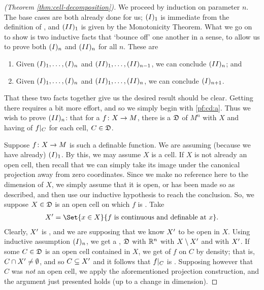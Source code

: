 \begin{proof}[\CD (Theorem \ref{thm:cell-decomposition})]
  We proceed by induction on parameter $n$. The base cases are both already done for us; $\In[1]$ is immediate from the definition of \omy, and $\IIn[1]$ is given by the Monotonicity Theorem. What we go on to show is two inductive facts that `bounce off' one another in a sense, to allow us to prove both $\In$ and $\IIn$ for all $n$. These are
  \begin{enumerate}[label=(\alph*)]
    \item \label{pf:cd:a} Given $\In[1], \hdots, \In$ and $\IIn[1], \hdots, \IIn[n-1]$, we can conclude $\IIn$; and
    \item \label{pf:cd:b} Given $\In[1], \hdots, \In$ and $\IIn[1], \hdots, \IIn[n]$, we can conclude $\In[n+1]$.
  \end{enumerate}
  That these two facts together give us the desired result should be clear.
  Getting there requires a bit more effort, and so we simply begin with \ref{pf:cd:a}.
  Thus we wish to prove $\IIn[n]$: that for a  $\funcdom{f}{X}{M}$, there is a \cd $\fancyD$ of $M^n$ \cmptble with $X$ and having \contty of $\funcrestr{f}{C}$ for each cell, $C \in \fancyD$.

  Suppose $\funcdom{f}{X}{M}$ is such a definable function. We are assuming (because we have already) $\In[1]$. By this, we may assume $X$ is a cell. If $X$ is not already an open cell, then recall that we can simply take its image under the canonical projection away from zero coordinates. Since we make no reference here to the dimension of $X$, we simply assume that it is open, or has been made so as described, and then use our inductive hypothesis to reach the conclusion. So, we suppose $X \in \fancyD$ is an open cell on which $f$ is \cont. Take
  \begin{align*}
	\Xprime = \Set{x \in X}{f \ \textrm{is \cont and \defnb at} \ x}.
  \end{align*}
  Clearly, $\Xprime$ is , and we are supposing that we know $\Xprime$ to be open in $X$. Using inductive assumption $\In[n]$, we get a \cd, $\fancyD$ with $\R^n$ \cmptble with $X \setminus \Xprime$ and with $\Xprime$. If some $C \in \fancyD$ is an open cell contained in $X$, we get \contty of $f$ on $C$  by density; that is, $C \cap \Xprime \neq \emptyset$, and so $C \subseteq \Xprime$ and it follows that $\funcrestr{f}{C}$ is \cont. Supposing however that $C$ was \emph{not} an open cell, we apply the aforementioned projection construction, and the argument just presented holds (up to a change in dimension).


\end{proof}
